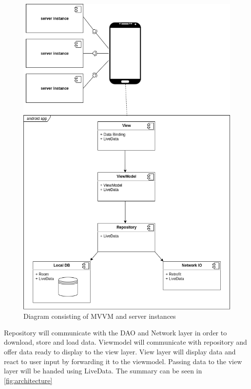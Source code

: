\begin{figure}\centering
	\includegraphics[width=1\textwidth]{pics/bc-architecture.png}
	\caption[Architecture]{Diagram consisting of MVVM and server instances}\label{fig:architecture}
\end{figure}

Repository will communicate with the DAO and Network layer in order to download, store and load data.
Viewmodel will communicate with repository and offer data ready to display to the view layer.
View layer will display data and react to user input by forwarding it to the viewmodel.
Passing data to the view layer will be handed using LiveData.
The summary can be seen in \autoref{fig:architecture}